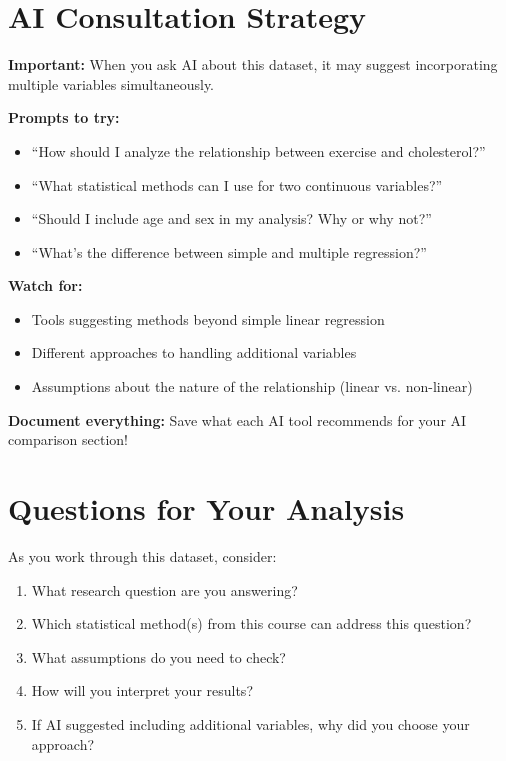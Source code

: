 \documentclass[11pt]{article}
\begin{document}
\section*{AI Consultation Strategy}

\begin{tcolorbox}[colback=aiblue!10,colframe=aiblue,boxrule=1pt,arc=2pt]
\textbf{Important:} When you ask AI about this dataset, it may suggest incorporating multiple variables simultaneously.

\textbf{Prompts to try:}
\begin{itemize}
\item ``How should I analyze the relationship between exercise and cholesterol?''
\item ``What statistical methods can I use for two continuous variables?''
\item ``Should I include age and sex in my analysis? Why or why not?''
\item ``What's the difference between simple and multiple regression?''
\end{itemize}

\textbf{Watch for:}
\begin{itemize}
\item Tools suggesting methods beyond simple linear regression
\item Different approaches to handling additional variables
\item Assumptions about the nature of the relationship (linear vs. non-linear)
\end{itemize}

\textbf{Document everything:} Save what each AI tool recommends for your AI comparison section!
\end{tcolorbox}

\section*{Questions for Your Analysis}

As you work through this dataset, consider:

\begin{enumerate}
\item What research question are you answering?
\item Which statistical method(s) from this course can address this question?
\item What assumptions do you need to check?
\item How will you interpret your results?
\item If AI suggested including additional variables, why did you choose your approach?
\end{enumerate}
\end{document}
